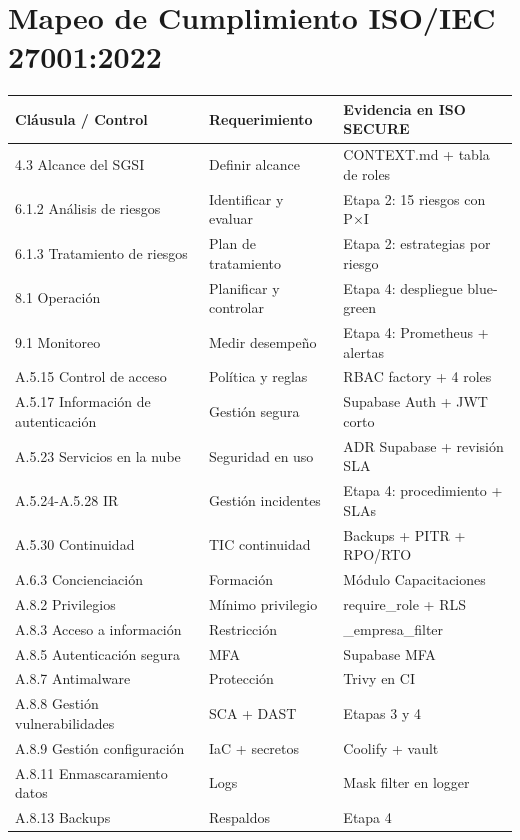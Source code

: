 \documentclass[12pt,a4paper,oneside]{article}
\begin{document}
\section{Mapeo de Cumplimiento ISO/IEC 27001:2022}

\begin{longtable}{p{2.5cm}p{4cm}p{7.5cm}}
\toprule
\textbf{Cláusula / Control} & \textbf{Requerimiento} & \textbf{Evidencia en ISO SECURE} \\
\midrule
\endhead
4.3 Alcance del SGSI & Definir alcance & CONTEXT.md + tabla de roles \\
6.1.2 Análisis de riesgos & Identificar y evaluar & Etapa 2: 15 riesgos con P×I \\
6.1.3 Tratamiento de riesgos & Plan de tratamiento & Etapa 2: estrategias por riesgo \\
8.1 Operación & Planificar y controlar & Etapa 4: despliegue blue-green \\
9.1 Monitoreo & Medir desempeño & Etapa 4: Prometheus + alertas \\
A.5.15 Control de acceso & Política y reglas & RBAC factory + 4 roles \\
A.5.17 Información de autenticación & Gestión segura & Supabase Auth + JWT corto \\
A.5.23 Servicios en la nube & Seguridad en uso & ADR Supabase + revisión SLA \\
A.5.24-A.5.28 IR & Gestión incidentes & Etapa 4: procedimiento + SLAs \\
A.5.30 Continuidad & TIC continuidad & Backups + PITR + RPO/RTO \\
A.6.3 Concienciación & Formación & Módulo Capacitaciones \\
A.8.2 Privilegios & Mínimo privilegio & require\_role + RLS \\
A.8.3 Acceso a información & Restricción & \_empresa\_filter \\
A.8.5 Autenticación segura & MFA & Supabase MFA \\
A.8.7 Antimalware & Protección & Trivy en CI \\
A.8.8 Gestión vulnerabilidades & SCA + DAST & Etapas 3 y 4 \\
A.8.9 Gestión configuración & IaC + secretos & Coolify + vault \\
A.8.11 Enmascaramiento datos & Logs & Mask filter en logger \\
A.8.13 Backups & Respaldos & Etapa 4 \\

\end{longtable}
\end{document}
